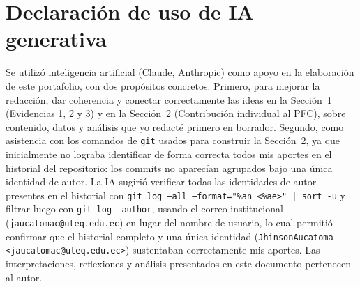 \documentclass[11pt]{article}
\begin{document}
    \section{Declaración de uso de IA generativa}
    Se utilizó inteligencia artificial (Claude, Anthropic) como apoyo en la elaboración de este portafolio, con dos propósitos concretos. Primero, para mejorar la redacción,
    dar coherencia y conectar correctamente las ideas en la Sección~1 (Evidencias 1, 2 y 3) y en la Sección~2 (Contribución individual al PFC), sobre contenido, datos y análisis
    que yo redacté primero en borrador. Segundo, como asistencia con los comandos de \texttt{git} usados para construir la Sección~2, ya que inicialmente no lograba identificar de
    forma correcta todos mis aportes en el historial del repositorio: los commits no aparecían agrupados bajo una única identidad de autor. La IA sugirió verificar todas las identidades
    de autor presentes en el historial con \texttt{git log --all --format="\%an <\%ae>" | sort -u} y filtrar luego con \texttt{git log --author}, usando el correo institucional (\texttt{jaucatomac@uteq.edu.ec})
    en lugar del nombre de usuario, lo cual permitió confirmar que el historial completo y una única identidad (\texttt{JhinsonAucatoma <jaucatomac@uteq.edu.ec>}) sustentaban correctamente mis aportes.
    Las interpretaciones, reflexiones y análisis presentados en este documento pertenecen al autor.
    \printbibliography[title={Referencias}]
\end{document}
